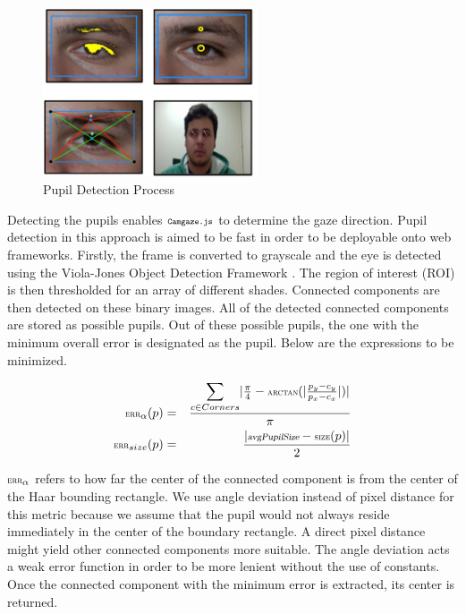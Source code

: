 \documentclass[annual]{acmsiggraph}
\newcommand{\Acronym}[1]{\ensuremath{{\small{\texttt{#1}}}}}
\newcommand{\Name}{\Acronym{Camgaze.js}} \newcommand{\False}{\Constant{false}}
\newcommand{\Function}[1]{\ensuremath{{\small \textsc{#1}}}}
\newcommand{\Constant}[1]{\ensuremath{\small{\texttt{#1}}}}
\newcommand{\Var}[1]{\ensuremath{{\small{\textsl{#1}}}}}
\begin{document}
\begin{figure}[ht]

    \centering

    \includegraphics[width=2.5in]{figs/pupilDetection.pdf}

    \caption{Pupil Detection Process}

\end{figure}

Detecting the pupils enables $\Name$ to determine the gaze direction.
Pupil detection in this approach is aimed to be fast in order to be deployable
onto web frameworks. Firstly, the frame is converted to grayscale and the eye
is detected using the Viola-Jones Object Detection Framework \cite{Viola01}.
The region of interest (ROI) is then thresholded for an array of different
shades. Connected components are then detected on these binary images. All of
the detected connected components are stored as possible pupils.  Out of these
possible pupils, the one with the minimum overall error is designated as the
pupil.  Below are the expressions to be minimized.

\begin{eqnarray}
\Function{err}_{\alpha}(p) &=& \frac{
    \mathlarger{\sum}_{c \in Corners}{
        \vert
            \frac{\pi}{4} - \Function{arctan}(
                \vert \frac{p_y - c_y}{p_x - c_x} \vert
            )
        \vert
    } }{\pi} \\ \Function{err}_{size}(p) &=& \frac{ \vert \Var{avgPupilSize} -
    \Function{size}(p) \vert }{2} \end{eqnarray}

$\Function{err}_{\alpha}$ refers to how far the center of the connected
component is from the center of the Haar bounding rectangle. We use angle
deviation instead of pixel distance for this metric because we assume that the
pupil would not always reside immediately in the center of the boundary
rectangle. A direct pixel distance might yield other connected components more
suitable.  The angle deviation acts a weak error function in order to be more
lenient without the use of constants.  Once the connected component with the
minimum error is extracted, its center is returned.
\end{document}
